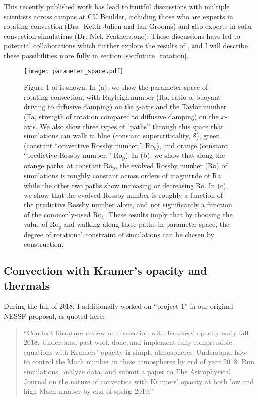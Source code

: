 \documentclass[aasms,12pt]{article}
\begin{document}
This recently published work has lead to fruitful discussions with multiple scientists across
campus at CU Boulder, including those who are experts in rotating convection 
(Drs.~Keith Julien and Ian Grooms)
and also experts in solar convection simulations (Dr. Nick Featherstone).
These discussions have led to potential collaborations which further explore the results
of \citet{anders&all2019}, and I will describe these possibilities
more fully in section \ref{sec:future_rotation}.

\begin{figure}[b!]
\centering
\texttt{[image: parameter\_space.pdf]}
\caption{Figure 1 of \citet{anders&all2019} is shown. In (a), we show the parameter space
of rotating convection, with Rayleigh number (Ra, ratio of buoyant driving to diffusive damping)
on the $y$-axis and the Taylor number (Ta, strength of rotation compared to diffusive damping)
on the $x$-axis. We also show three types of ``paths'' through this space that simulations
can walk in blue (constant supercriticality, $\mathcal{S}$), green
(constant ``convective Rossby number,'' Ro$_{\text{c}}$), and orange 
(constant ``predictive Rossby number,'' Ro$_{\text{p}}$). 
In (b), we show that along the orange paths, at
constant Ro$_\text{p}$, the evolved Rossby number (Ro) of simulations is
roughly constant across orders of magnitude of Ra, while the other two paths show
increasing or decreasing Ro. In (c), we show that the evolved Rossby number
is roughly a function of the predictive Rossby number alone, and not significantly a function
of the commonly-used Ro$_{\text{c}}$. These results imply that by choosing the value of
Ro$_\text{p}$ and walking along these paths in parameter space, the degree of rotational
constraint of simulations can be chosen by construction.
\label{fig:rossby}}
\end{figure}

\subsection{Convection with Kramer's opacity and thermals}
\label{sec:thermals}
During the fall of 2018, I additionally
worked on ``project 1'' in our original NESSF proposal, as quoted here:

\begin{quote}
``Conduct literature review on convection with Kramers' opacity early fall 2018.  
Understand past work done, and implement fully compressible equations with Kramers'
opacity in simple atmospheres.  Understand how to control the Mach number in these
atmospheres by end of year 2018.  Run simulations, analyze data, and submit a paper to The Astrophysical Journal
on the nature of convection with Kramers' opacity at both low and high Mach number by
end of spring 2019.''
\end{quote}
\end{document}
